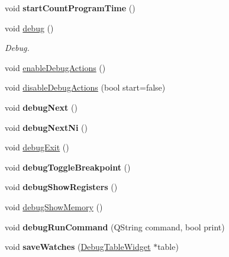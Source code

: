 \begin{DoxyCompactItemize}
\item 
\hypertarget{class_main_window_a52de98a5b987796cae5c2a1d5660037c}{}void {\bfseries start\+Count\+Program\+Time} ()\label{class_main_window_a52de98a5b987796cae5c2a1d5660037c}

\item 
void \hyperlink{class_main_window_ac1ebf6edc016999e6e55b58c2efc322e}{debug} ()
\begin{DoxyCompactList}\small\item\em Debug. \end{DoxyCompactList}\item 
void \hyperlink{class_main_window_a1ecd0f10a8b0acfaf63c1bb4f1b77cfb}{enable\+Debug\+Actions} ()
\item 
void \hyperlink{class_main_window_ad11440fb016244cd6f3fa947022ad713}{disable\+Debug\+Actions} (bool start=false)
\item 
\hypertarget{class_main_window_a3e9fb363847ac215097e42c5d2b12083}{}void {\bfseries debug\+Next} ()\label{class_main_window_a3e9fb363847ac215097e42c5d2b12083}

\item 
\hypertarget{class_main_window_a44cc0c28c3f5038f955a7e463497a9da}{}void {\bfseries debug\+Next\+Ni} ()\label{class_main_window_a44cc0c28c3f5038f955a7e463497a9da}

\item 
void \hyperlink{class_main_window_a0d8f20a9b47c566a76a96633188372fa}{debug\+Exit} ()
\item 
\hypertarget{class_main_window_aee811445332a4f7db279652ec332fe66}{}void {\bfseries debug\+Toggle\+Breakpoint} ()\label{class_main_window_aee811445332a4f7db279652ec332fe66}

\item 
\hypertarget{class_main_window_ac50abb82874b91085ceea8f565fd5f5a}{}void {\bfseries debug\+Show\+Registers} ()\label{class_main_window_ac50abb82874b91085ceea8f565fd5f5a}

\item 
void \hyperlink{class_main_window_af0e3a62c03cbe1723ba91d7cb21ec3c1}{debug\+Show\+Memory} ()
\item 
\hypertarget{class_main_window_a15b7242ca96db2dfaec976b3b6570aa6}{}void {\bfseries debug\+Run\+Command} (Q\+String command, bool print)\label{class_main_window_a15b7242ca96db2dfaec976b3b6570aa6}

\item 
\hypertarget{class_main_window_abcac2850930ae7f17bb5e01421630577}{}void {\bfseries save\+Watches} (\hyperlink{class_debug_table_widget}{Debug\+Table\+Widget} $\ast$table)\label{class_main_window_abcac2850930ae7f17bb5e01421630577}


\end{DoxyCompactItemize}
